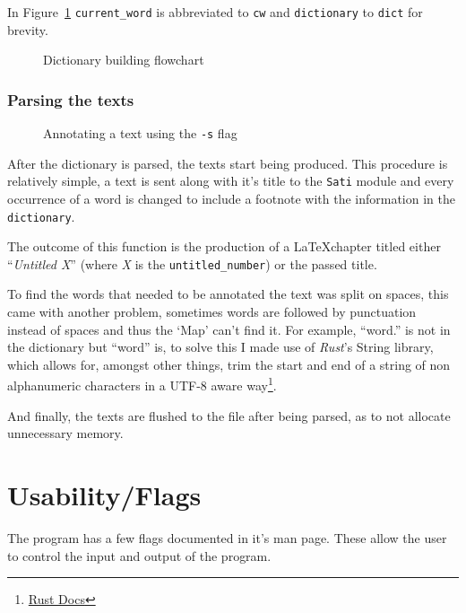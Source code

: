 \documentclass[a4paper]{report}
\begin{document}
In Figure~\ref{fig:flow} \texttt{current\_word} is abbreviated to \texttt{cw}
and \texttt{dictionary} to \texttt{dict} for brevity.

\begin{figure}[H]
    \centering
    
    \caption{Dictionary building flowchart}\label{fig:flow}
\end{figure}

\subsection{Parsing the texts}

\begin{figure}
    \centering
    
    \caption{Annotating a text using the \texttt{-s} flag}
\end{figure}

After the dictionary is parsed, the texts start being produced. This procedure
is relatively simple, a text is sent along with it's title to the \texttt{Sati}
module and every occurrence of a word is changed to include a footnote with
the information in the \texttt{dictionary}.

The outcome of this function is the production of a \LaTeX chapter titled
either ``\textit{Untitled X}'' (where \textit{X} is the
\texttt{untitled\_number}) or the passed title.

To find the words that needed to be annotated the text was split on spaces,
this came with another problem, sometimes words are followed by punctuation
instead of spaces and thus the `Map' can't find it. For example, ``word.'' is
not in the dictionary but ``word'' is, to solve this I made use of
\textit{Rust}'s String library, which allows for, amongst other things, trim
the start and end of a string of non alphanumeric characters in a UTF-8 aware
way\footnote{\href{https://doc.rust-lang.org/std/primitive.str.html\#method.trim_start_matches}{Rust Docs}}.

And finally, the texts are flushed to the file after being parsed, as to not
allocate unnecessary memory.

\chapter{Usability/Flags}\label{cha:flags}

The program has a few flags documented in it's man page. These allow the user
to control the input and output of the program.
\end{document}
